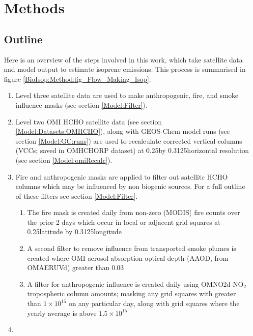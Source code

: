   
\section{Methods}
  \label{BioIsop:Methods}
  
  \subsection{Outline}
    Here is an overview of the steps involved in this work, which take satellite data and model output to estimate isoprene emissions.
    This process is summarised in figure \ref{BioIsop:Method:fig_Flow_Making_Isop}.
    \begin{enumerate}
      \item 
        Level three satellite data are used to make anthropogenic, fire, and smoke influence masks (see section \ref{Model:Filter}).
      \item 
        Level two OMI HCHO satellite data (see section \ref{Model:Datasets:OMHCHO}), along with GEOS-Chem model runs (see section \ref{Model:GC:runs}) are used to recalculate corrected vertical columns (VCCs; saved in OMHCHORP dataset) at 0.25\degr by 0.3125\degr horizontal resolution (see section \ref{Model:omiRecalc}).
      \item 
        Fire and anthropogenic masks are applied to filter out satellite HCHO columns which may be influenced by non biogenic sources.
        For a full outline of these filters see section \ref{Model:Filter}.
      \begin{enumerate}
        \item 
          The fire mask is created daily from non-zero (MODIS) fire counts over the prior 2 days which occur in local or adjacent grid squares at 0.25\degr latitude by 0.3125\degr longitude
        \item 
          A second filter to remove influence from transported smoke plumes is created where OMI aerosol absorption optical depth (AAOD, from OMAERUVd) greater than 0.03
        \item 
          A filter for anthropogenic influence is created daily using OMNO2d NO$_2$ tropospheric column amounts; masking any grid squares with greater than $1\times 10 ^{15}$ on any particular day, along with grid squares where the yearly average is above $1.5 \times 10^{15}$\moleccm
      \end{enumerate}
      \item 

\end{enumerate}
